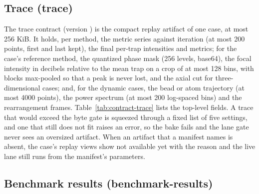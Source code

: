 

\subsection{Trace (trace)}\label{sec:data-trace}

The trace contract (version ) is the compact replay artifact of one case, at most 256 KiB. It holds, per method, the metric series against iteration (at most 200 points, first and last kept), the final per-trap intensities and metrics; for the case's reference method, the quantized phase mask (256 levels, base64), the focal intensity in decibels relative to the mean trap on a crop of at most 128 bins, with blocks max-pooled so that a peak is never lost, and the axial cut for three-dimensional cases; and, for the dynamic cases, the bead or atom trajectory (at most 4000 points), the power spectrum (at most 200 log-spaced bins) and the rearrangement frames. Table~\ref{tab:contract-trace} lists the top-level fields. A trace that would exceed the byte gate is squeezed through a fixed list of five settings, and one that still does not fit raises an error, so the bake fails and the lane gate never sees an oversized artifact. When an artifact that a manifest names is absent, the case's replay views show not available yet with the reason and the live lane still runs from the manifest's parameters.



\subsection{Benchmark results (benchmark-results)}\label{sec:data-benchmark-results}

